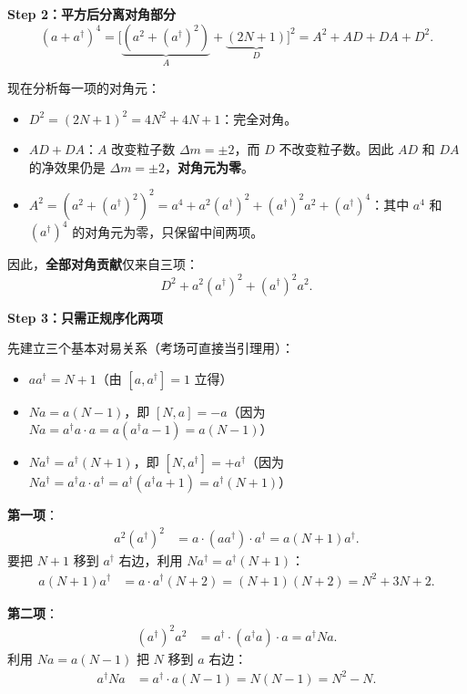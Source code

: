 \textbf{Step 2：平方后分离对角部分}
\[
(a+a^\dagger)^4 = \bigl[\underbrace{(a^2+(a^\dagger)^2)}_{A} + \underbrace{(2N+1)}_{D}\bigr]^2 = A^2 + AD + DA + D^2.
\]

现在分析每一项的对角元：
\begin{itemize}[nosep]
    \item \textbf{$D^2 = (2N+1)^2 = 4N^2+4N+1$}：完全对角。
    \item \textbf{$AD+DA$}：$A$ 改变粒子数 $\Delta m = \pm 2$，而 $D$ 不改变粒子数。因此 $AD$ 和 $DA$ 的净效果仍是 $\Delta m = \pm 2$，\textbf{对角元为零}。
    \item \textbf{$A^2 = (a^2+(a^\dagger)^2)^2 = a^4 + a^2(a^\dagger)^2 + (a^\dagger)^2 a^2 + (a^\dagger)^4$}：其中 $a^4$ 和 $(a^\dagger)^4$ 的对角元为零，只保留中间两项。
\end{itemize}

因此，\textbf{全部对角贡献}仅来自三项：
\[
D^2 + a^2(a^\dagger)^2 + (a^\dagger)^2 a^2.
\]

\textbf{Step 3：只需正规序化两项}

先建立三个基本对易关系（考场可直接当引理用）：
\begin{itemize}[nosep]
    \item $aa^\dagger = N + 1$（由 $[a, a^\dagger] = 1$ 立得）
    \item $Na = a(N-1)$，即 $[N, a] = -a$（因为 $Na = a^\dagger a \cdot a = a(a^\dagger a - 1) = a(N-1)$）
    \item $Na^\dagger = a^\dagger(N+1)$，即 $[N, a^\dagger] = +a^\dagger$（因为 $Na^\dagger = a^\dagger a \cdot a^\dagger = a^\dagger(a^\dagger a + 1) = a^\dagger(N+1)$）
\end{itemize}

\textbf{第一项}：
\begin{align*}
a^2(a^\dagger)^2 &= a \cdot (aa^\dagger) \cdot a^\dagger = a(N+1)a^\dagger.
\end{align*}
要把 $N+1$ 移到 $a^\dagger$ 右边，利用 $Na^\dagger = a^\dagger(N+1)$：
\begin{align*}
a(N+1)a^\dagger &= a \cdot a^\dagger(N+2) = (N+1)(N+2) = N^2 + 3N + 2.
\end{align*}

\textbf{第二项}：
\begin{align*}
(a^\dagger)^2 a^2 &= a^\dagger \cdot (a^\dagger a) \cdot a = a^\dagger N a.
\end{align*}
利用 $Na = a(N-1)$ 把 $N$ 移到 $a$ 右边：
\begin{align*}
a^\dagger N a &= a^\dagger \cdot a(N-1) = N(N-1) = N^2 - N.
\end{align*}

